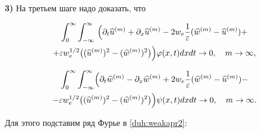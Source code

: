 \smallskip



{\bf 3)} На третьем шаге надо доказать, что

\begin{multline}

\int_0^\infty \int_{-\infty}^\infty~\Bigl(\pa_t\widehat{u}^{(m)}+\pa_x\widehat{u}^{(m)}-2w_e\frac{1}{\ve}(\widehat{w}^{(m)}-\widehat{u}^{(m)})+

\\

+\ve w_e^{1/2}

\bigl((\widehat{u}^{(m)})^2-(\widehat{w}^{(m)})^2\bigr)\Bigr) \varphi(x,t) dxdt\to 0, \quad m\to\infty, 

\label{duh:weakapr1}

\end{multline}

\begin{multline}

\int_0^\infty \int_{-\infty}^\infty 

\Bigl(\pa_t\widehat{w}^{(m)}-\pa_x\widehat{w}^{(m)}+2w_e\frac{1}{\ve}(\widehat{w}^{(m)}-\widehat{u}^{(m)})-

\\

-\ve w_e^{1/2}

\bigl((\widehat{u}^{(m)})^2-(\widehat{w}^{(m)})^2\bigr)\Bigr) \psi(x,t) dxdt\to 0, \quad m\to\infty. 

\label{duh:weakapr2}

\end{multline}

Для этого подставим ряд Фурье в \eqref{duh:weakapr2}:

